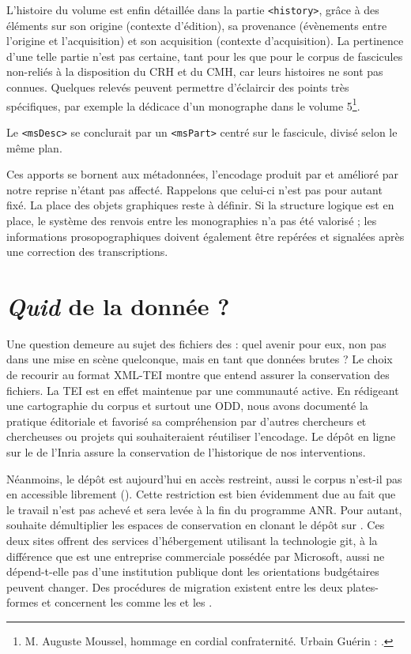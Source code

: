 L'histoire du volume est enfin détaillée dans la partie \texttt{<history>}, grâce à des éléments sur son origine (contexte d'édition), sa provenance (évènements entre l'origine et l'acquisition) et son acquisition (contexte d'acquisition). La pertinence d'une telle partie n'est pas certaine, tant pour les \odm{} que pour le corpus de fascicules non-reliés à la disposition du CRH et du CMH, car leurs histoires ne sont pas connues. Quelques relevés peuvent permettre d'éclaircir des points très spécifiques, par exemple la dédicace d'un monographe dans le volume 5\footnote{\og M. Auguste Moussel, hommage en cordial confraternité. Urbain Guérin \fg{} : \cite{mono083a}.}.

Le \texttt{<msDesc>} se conclurait par un \texttt{<msPart>} centré sur le fascicule, divisé selon le même plan.

Ces apports se bornent aux métadonnées, l'encodage produit par \lse{} et amélioré par notre reprise n'étant pas affecté. Rappelons que celui-ci n'est pas pour autant fixé. La place des objets graphiques reste à définir. Si la structure logique est en place, le système des renvois entre les monographies n'a pas été valorisé ; les informations prosopographiques doivent également être repérées et signalées après une correction des transcriptions.

\section{\textit{Quid} de la donnée ?}

Une question demeure au sujet des fichiers des \odm{} : quel avenir pour eux, non pas dans une mise en scène quelconque, mais en tant que données brutes ? Le choix de recourir au format XML-TEI montre que \timeus{} entend assurer la conservation des fichiers. La TEI est en effet maintenue par une communauté active. En rédigeant une cartographie du corpus et surtout une ODD, nous avons documenté la pratique éditoriale et favorisé sa compréhension par d'autres chercheurs et chercheuses ou projets qui souhaiteraient réutiliser l'encodage. Le dépôt en ligne sur le \gitlab{} de l'Inria assure la conservation de l'historique de nos interventions.

Néanmoins, le dépôt \gitlab{} est aujourd'hui en accès restreint, aussi le corpus n'est-il pas en accessible librement (\openaccess). Cette restriction est bien évidemment due au fait que le travail n'est pas achevé et sera levée à la fin du programme ANR. Pour autant, \timeus{} souhaite démultiplier les espaces de conservation en clonant le dépôt \gitlab{} sur \github. Ces deux sites offrent des services d'hébergement utilisant la technologie git, à la différence que \github{} est une entreprise commerciale possédée par Microsoft, aussi ne dépend-t-elle pas d'une institution publique dont les orientations budgétaires peuvent changer. Des procédures de migration existent entre les deux plates-formes et concernent les \commits{} comme les \issues{} et les \mergerequests.

